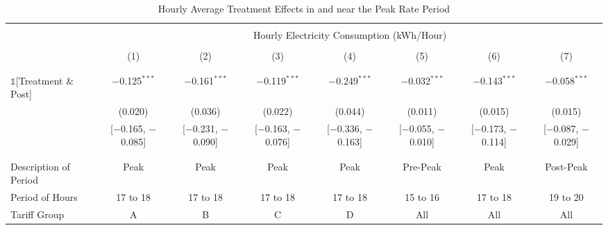     \begin{table}[t!]
        \centering
        \caption{Hourly Average Treatment Effects in and near the Peak Rate Period}
        \label{Table:Hourly-Average-Treatment-Effects-in-and-near-the-Peak-Rate-Period}
        \vspace{0.1cm}
        \small
        \begin{adjustbox}{scale = 0.75}
            \begin{threeparttable}
                \begin{tabular}{@{\extracolsep{3pt}}lccccccc}
                    \\[-5.5ex]
                    \hline \hline
                    \\[-3.0ex]
                    & \multicolumn{7}{c}{Hourly Electricity Consumption  (kWh/Hour)} \\
                    \\[-3.0ex]
                    & (1) & (2) & (3) & (4) & (5) & (6) & (7) \\
                    \\[-3.0ex]
                    \hline
                    \\[-2.0ex]
                    $\mathbb{1}$[Treatment \& Post] & $-$0.125$^{***}$ & $-$0.161$^{***}$ & $-$0.119$^{***}$ & $-$0.249$^{***}$ & $-$0.032$^{***}$ & $-$0.143$^{***}$ & $-$0.058$^{***}$ \\
                    & (0.020) & (0.036) & (0.022) & (0.044) & (0.011) & (0.015) & (0.015) \\
                    & [$-$0.165, $-$0.085] & [$-$0.231, $-$0.090] & [$-$0.163, $-$0.076] & [$-$0.336, $-$0.163] & [$-$0.055, $-$0.010] & [$-$0.173, $-$0.114] & [$-$0.087, $-$0.029] \\
                    & & & & & & & \\
                    \hline
                    \\[-2.0ex]
                    Description of Period & Peak & Peak & Peak & Peak & Pre-Peak & Peak & Post-Peak \\
                    Period of Hours & 17 to 18 & 17 to 18 & 17 to 18 & 17 to 18 & 15 to 16 & 17 to 18 & 19 to 20 \\
                    Tariff Group & A & B & C & D & All & All & All \\

\end{tabular}
\end{threeparttable}
\end{adjustbox}
\end{table}
